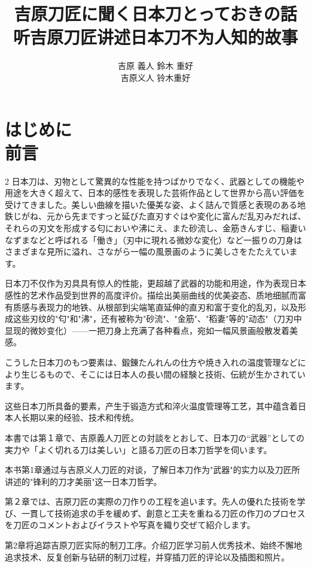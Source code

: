 \documentclass[12pt,UTF8]{ctexbook}
\title{吉原刀匠に聞く日本刀とっておきの話 \\[0.5em] {\large 听吉原刀匠讲述日本刀不为人知的故事}}
\author{吉原 義人 \quad 鈴木 重好 \\[0.3em] {\normalsize 吉原义人 \quad 铃木重好}}
\date{}
\begin{document}
\maketitle

\frontmatter
\tableofcontents

\chapter{はじめに \\ 前言}

\begin{paracol}{2}
日本刀は、刃物として驚異的な性能を持つばかりでなく、武器としての機能や用途を大きく超えて、日本的感性を表現した芸術作品として世界から高い評価を受けてきました。美しい曲線を描いた優美な姿、よく詰んで質感と表現のある地鉄じがね、元から先まですっと延びた直刃すぐはや変化に富んだ乱刃みだれば、それらの刃文を形成する匂においや沸にえ、また砂流し、金筋きんすじ、稲妻いなずまなどと呼ばれる「働き」（刃中に現れる微妙な変化）など一振りの刀身はさまざまな見所に溢れ、さながら一幅の風景画のように美しさをたたえています。

\switchcolumn

日本刀不仅作为刃具具有惊人的性能，更超越了武器的功能和用途，作为表现日本感性的艺术作品受到世界的高度评价。描绘出美丽曲线的优美姿态、质地细腻而富有质感与表现力的地铁、从根部到尖端笔直延伸的直刃和富于变化的乱刃，以及形成这些刃纹的"匂"和"沸"，还有被称为"砂流"、"金筋"、"稻妻"等的"动态"（刀刃中显现的微妙变化）——一把刀身上充满了各种看点，宛如一幅风景画般散发着美感。

\switchcolumn*

こうした日本刀のもつ要素は、鍛錬たんれんの仕方や焼き入れの温度管理などにより生じるもので、そこには日本人の長い間の経験と技術、伝統が生かされています。

\switchcolumn

这些日本刀所具备的要素，产生于锻造方式和淬火温度管理等工艺，其中蕴含着日本人长期以来的经验、技术和传统。

\switchcolumn*

本書では第１章で、吉原義人刀匠との対談をとおして、日本刀の“武器”としての実力や「よく切れる刀は美しい」と語る刀匠の日本刀哲学を伺います。

\switchcolumn

本书第1章通过与吉原义人刀匠的对谈，了解日本刀作为"武器"的实力以及刀匠所讲述的"锋利的刀才美丽"这一日本刀哲学。

\switchcolumn*

第２章では、吉原刀匠の実際の刀作りの工程を追います。先人の優れた技術を学び、一貫して技術追求の手を緩めず、創意と工夫を重ねる刀匠の作刀のプロセスを刀匠のコメントおよびイラストや写真を織り交ぜて紹介します。

\switchcolumn

第2章将追踪吉原刀匠实际的制刀工序。介绍刀匠学习前人优秀技术、始终不懈地追求技术、反复创新与钻研的制刀过程，并穿插刀匠的评论以及插图和照片。
\end{paracol}
\end{document}
